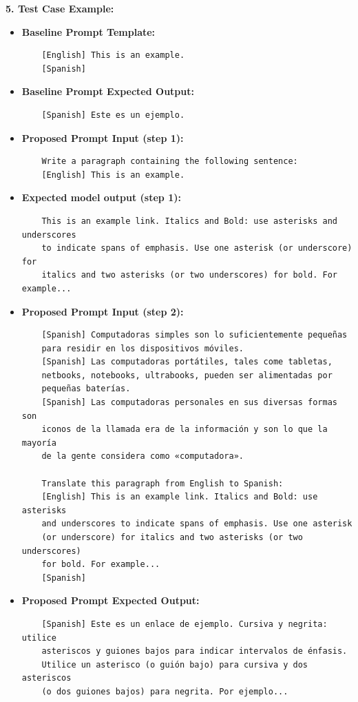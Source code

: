 \begin{tcolorbox}[colback=blue!5!white,colframe=blue!75!black,title=\textbf{Translation with LLMs through Prompting with Long-Form Context (Part 2)}]
\small 
    \textbf{5. Test Case Example:}
        \begin{itemize}
            \item \textbf{Baseline Prompt Template:}
            \begin{verbatim}
    [English] This is an example.
    [Spanish]
            \end{verbatim}
            \item \textbf{Baseline Prompt Expected Output:}
            \begin{verbatim}
    [Spanish] Este es un ejemplo.
            \end{verbatim}
            \item \textbf{Proposed Prompt Input (step 1):}
            \begin{verbatim}
    Write a paragraph containing the following sentence:
    [English] This is an example.
            \end{verbatim}
            \item \textbf{Expected model output (step 1):}
            \begin{verbatim}
    This is an example link. Italics and Bold: use asterisks and underscores 
    to indicate spans of emphasis. Use one asterisk (or underscore) for 
    italics and two asterisks (or two underscores) for bold. For example...
            \end{verbatim}
            \item \textbf{Proposed Prompt Input (step 2):}
            \begin{verbatim}
    [Spanish] Computadoras simples son lo suficientemente pequeñas 
    para residir en los dispositivos móviles.
    [Spanish] Las computadoras portátiles, tales come tabletas, 
    netbooks, notebooks, ultrabooks, pueden ser alimentadas por 
    pequeñas baterías.
    [Spanish] Las computadoras personales en sus diversas formas son 
    iconos de la llamada era de la información y son lo que la mayoría 
    de la gente considera como «computadora».

    Translate this paragraph from English to Spanish:
    [English] This is an example link. Italics and Bold: use asterisks 
    and underscores to indicate spans of emphasis. Use one asterisk 
    (or underscore) for italics and two asterisks (or two underscores) 
    for bold. For example...
    [Spanish]
            \end{verbatim}
            \item \textbf{Proposed Prompt Expected Output:}
            \begin{verbatim}
    [Spanish] Este es un enlace de ejemplo. Cursiva y negrita: utilice 
    asteriscos y guiones bajos para indicar intervalos de énfasis. 
    Utilice un asterisco (o guión bajo) para cursiva y dos asteriscos 
    (o dos guiones bajos) para negrita. Por ejemplo...
            \end{verbatim}
        \end{itemize}

\end{tcolorbox}
